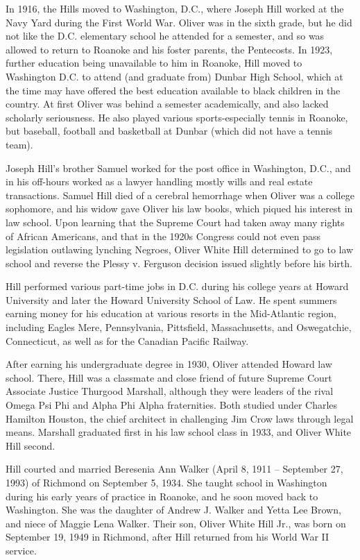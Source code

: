 In 1916, the Hills moved to Washington, D.C., where Joseph Hill worked
at the Navy Yard during the First World War. Oliver was in the sixth
grade, but he did not like the D.C. elementary school he attended for a
semester, and so was allowed to return to Roanoke and his foster
parents, the Pentecosts. In 1923, further education being unavailable to
him in Roanoke, Hill moved to Washington D.C. to attend (and graduate
from) Dunbar High School, which at the time may have offered the best
education available to black children in the country. At first Oliver
was behind a semester academically, and also lacked scholarly
seriousness. He also played various sports-especially tennis in Roanoke,
but baseball, football and basketball at Dunbar (which did not have a
tennis team).

Joseph Hill's brother Samuel worked for the post office in Washington,
D.C., and in his off-hours worked as a lawyer handling mostly wills and
real estate transactions. Samuel Hill died of a cerebral hemorrhage when
Oliver was a college sophomore, and his widow gave Oliver his law books,
which piqued his interest in law school. Upon learning that the Supreme
Court had taken away many rights of African Americans, and that in the
1920s Congress could not even pass legislation outlawing lynching
Negroes, Oliver White Hill determined to go to law school and reverse
the Plessy v. Ferguson decision issued slightly before his birth.

Hill performed various part-time jobs in D.C. during his college years
at Howard University and later the Howard University School of Law. He
spent summers earning money for his education at various resorts in the
Mid-Atlantic region, including Eagles Mere, Pennsylvania, Pittsfield,
Massachusetts, and Oswegatchie, Connecticut, as well as for the Canadian
Pacific Railway.

After earning his undergraduate degree in 1930, Oliver attended Howard
law school. There, Hill was a classmate and close friend of future
Supreme Court Associate Justice Thurgood Marshall, although they were
leaders of the rival Omega Psi Phi and Alpha Phi Alpha fraternities.
Both studied under Charles Hamilton Houston, the chief architect in
challenging Jim Crow laws through legal means. Marshall graduated first
in his law school class in 1933, and Oliver White Hill second.

Hill courted and married Beresenia Ann Walker (April 8, 1911 --
September 27, 1993) of Richmond on September 5, 1934. She taught school
in Washington during his early years of practice in Roanoke, and he soon
moved back to Washington. She was the daughter of Andrew J. Walker and
Yetta Lee Brown, and niece of Maggie Lena Walker. Their son, Oliver
White Hill Jr., was born on September 19, 1949 in Richmond, after Hill
returned from his World War II service.

